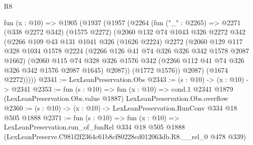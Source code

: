 \begin{lexlean}{R8}
\begin{coremodule}
  fun (x : @10) =>
  @1905
    (@1937
      (@1957
        (@2264
          (fun ("_" : @2265) =>
          @2271
            (@338 @2272 @342)
            (@1575 @2272)
            (@2060
              @132
              @74
              @1043
              @326
              @2272
              @342
              (@2266
                @109
                @43
                @131
                @1041
                @326
                (@1626 @2224)
                @2272
                (@2060
                  @129
                  @117
                  @328
                  @1034
                  @1578
                  @2224
                  (@2266 @126 @41 @74 @326 @326 @342 @1578 @2087 @1662)
                  (@2060
                    @115
                    @74
                    @328
                    @326
                    @1576
                    @342
                    (@2266 @112 @41 @74 @326 @326 @342 @1576 @2087 @1645)
                    @2087))
                (@1772 @1576))
              @2087)
            (@1674 @2272)))))
@2341 := LexLeanPreservation.Obs
@2343 := (s : @10) -> (x : @10) -> @2341
@2353 := fun (s : @10) =>
  fun (x : @10) =>
  cond.{1} @2341 @1879 (LexLeanPreservation.Obs.value @1887) LexLeanPreservation.Obs.overflow
@2360 := (s : @10) -> (x : @10) -> LexLeanPreservation.RunConv @334 @18 @505 @1888
@2371 := fun (s : @10) =>
  fun (x : @10) =>
  LexLeanPreservation.run_of_funRel
    @334
    @18
    @505
    @1888
    (LexLeanPreserve.C981f2f2364c61b8cf80228cd012063db.R8.__rel_0 @478 @339)
\end{coremodule}
\end{lexlean}
